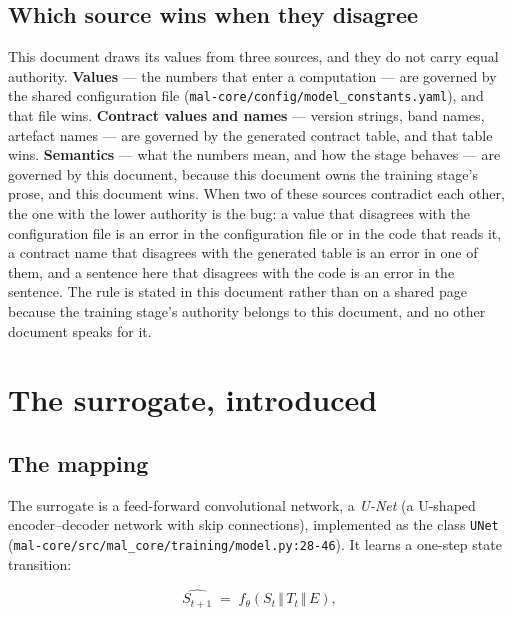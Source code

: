 \documentclass[11pt,a4paper]{article}
\newcommand{\codex}[1]{\texttt{#1}}
\begin{document}
\subsection{Which source wins when they disagree}

This document draws its values from three sources, and they do not carry equal
authority. \textbf{Values} --- the numbers that enter a computation --- are
governed by the shared configuration file
(\codex{mal-core/\allowbreak{}config/\allowbreak{}model\_\allowbreak{}constants.yaml}), and that file wins.
\textbf{Contract values and names} --- version strings, band names, artefact
names --- are governed by the generated contract table, and that table wins.
\textbf{Semantics} --- what the numbers mean, and how the stage behaves --- are
governed by this document, because this document owns the training stage's
prose, and this document wins. When two of these sources contradict each
other, the one with the lower authority is the bug: a value that disagrees
with the configuration file is an error in the configuration file or in the
code that reads it, a contract name that disagrees with the generated table
is an error in one of them, and a sentence here that disagrees with the code
is an error in the sentence. The rule is stated in this document rather than
on a shared page because the training stage's authority belongs to this
document, and no other document speaks for it.

\section{The surrogate, introduced}

\label{sec:surrogate}

\subsection{The mapping}

The surrogate is a feed-forward convolutional network, a \emph{U-Net}
(a U-shaped encoder--decoder network with skip connections), implemented as
the class \codex{UNet} (\codex{mal-core/\allowbreak{}src/\allowbreak{}mal\_\allowbreak{}core/\allowbreak{}training/\allowbreak{}model.py:28-46}).
It learns a one-step state transition:

\begin{equation}
\widehat{S_{t+1}} \;=\; f_\theta\!\left(S_t \,\Vert\, T_t \,\Vert\, E\right),
\label{eq:mapping}
\end{equation}
\end{document}
